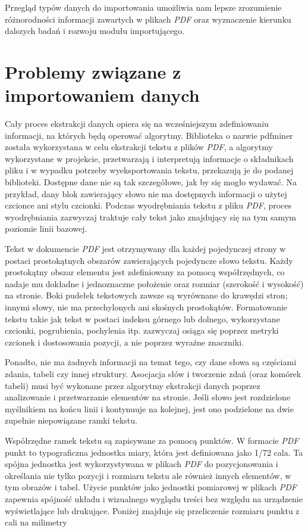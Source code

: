 \documentclass[a4paper,twoside,12pt]{book}
\begin{document}
Przegląd typów danych do importowania umożliwia nam lepsze zrozumienie różnorodności informacji zawartych w plikach \emph{PDF} oraz wyznaczenie kierunku dalszych badań i rozwoju modułu importującego.


\section{Problemy związane z importowaniem danych}

Cały proces ekstrakcji danych opiera się na wcześniejszym zdefiniowaniu informacji, na których będą operować algorytmy. Biblioteka o nazwie pdfminer\cite{bib:pdfminer} została wykorzystana w celu ekstrakcji tekstu z plików \emph{PDF}, a algorytmy wykorzystane w projekcie, przetwarzają i interpretują informacje o składnikach pliku i w wypadku potrzeby wyeksportowania tekstu, przekazują je do podanej biblioteki. Dostępne dane nie są tak szczegółowe, jak by się mogło wydawać. Na przykład, dany blok zawierający słowo nie ma dostępnych informacji o użytej czcionce ani stylu czcionki. Podczas wyodrębniania tekstu z pliku \emph{PDF}, proces wyodrębniania zazwyczaj traktuje cały tekst jako znajdujący się na tym samym poziomie linii bazowej.  

Tekst w dokumencie \emph{PDF} jest otrzymywany dla każdej pojedynczej strony w postaci prostokątnych obszarów zawierających pojedyncze słowo tekstu. Każdy prostokątny obszar elementu jest zdefiniowany za pomocą współrzędnych, co nadaje mu dokładne i jednoznaczne położenie oraz rozmiar (szerokość i wysokość) na stronie. Boki pudełek tekstowych zawsze są wyrównane do krawędzi stron; innymi słowy, nie ma przechylonych ani skośnych prostokątów. Formatowanie tekstu takie jak tekst w postaci indeksu górnego lub dolnego, wykorzystane czcionki, pogrubienia, pochylenia itp. zazwyczaj osiąga się poprzez metryki czcionek i dostosowania pozycji, a nie poprzez wyraźne znaczniki.

Ponadto, nie ma żadnych informacji na temat tego, czy dane słowa są częściami zdania, tabeli czy innej struktury. Asocjacja słów i tworzenie zdań (oraz komórek tabeli) musi być wykonane przez algorytmy ekstrakcji danych poprzez analizowanie i przetwarzanie elementów na stronie. Jeśli słowo jest rozdzielone myślnikiem na końcu linii i kontynuuje na kolejnej, jest ono podzielone na dwie zupełnie niepowiązane ramki tekstu.

Współrzędne ramek tekstu są zapisywane za pomocą punktów. W formacie \emph{PDF} punkt to typograficzna jednostka miary, która jest definiowana jako 1/72 cala. Ta spójna jednostka jest wykorzystywana w plikach \emph{PDF} do pozycjonowania i określania nie tylko pozycji i rozmiaru tekstu ale również innych elementów, w tym obrazów i tabel. Użycie punktów jako jednostki pomiarowej w plikach \emph{PDF} zapewnia spójność układu i wizualnego wyglądu treści bez względu na urządzenie wyświetlające lub drukujące. Poniżej znajduje się przeliczenie rozmiaru punktu z cali na milimetry
\end{document}
